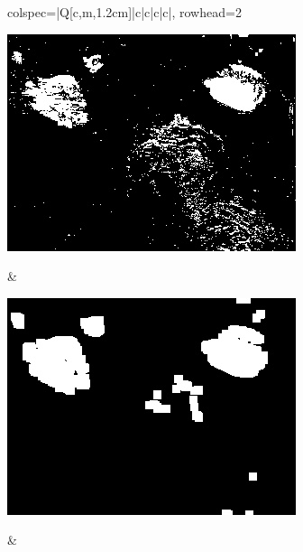 \begin{longtblr}[
            caption = {Hasil uji coba proses \textit{background subtraction} menggunakan GMM yang disempurnakan oleh Operasi Morfologi},
            label = {tab:gmm_morph_9908}
        ]{
            colspec={|Q[c,m,1.2cm]|c|c|c|c|},
            rowhead=2
        }
\begin{minipage}{0.19\textwidth}
                \includegraphics[width=\linewidth]{image/gt_116/gt_116_gmm_frame859.jpg}
            \end{minipage} & 
            \begin{minipage}{0.19\textwidth}
                \includegraphics[width=\linewidth]{image/gt_116/gt_116_dilated_3x9_frame859.jpg}
            \end{minipage} &
            \begin{minipage}{0.19\textwidth}

\end{minipage}
\end{longtblr}
